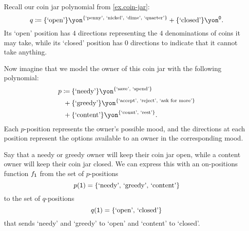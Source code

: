 \documentclass[Book-Poly]{subfiles}
\begin{document}
\begin{example}
  Recall our coin jar polynomial from \cref{ex.coin-jar}:
  \[
    q\coloneqq\{\text{`open'}\}\yon^{\{\text{`penny', `nickel', `dime', `quarter'}\}}+\{\text{`closed'}\}\yon^\0.
  \]
  Its `open' position has $4$ directions representing the $4$ denominations of coins it may take, while its `closed' position has $0$ directions to indicate that it cannot take anything.

  Now imagine that we model the owner of this coin jar with the following polynomial:
  \begin{align*}
    p\coloneqq\:
    &\{\text{`needy'}\}\yon^{\{\text{`save', `spend'}\}}
      \\
    +\:
    &\{\text{`greedy'}\}\yon^{\{\text{`accept', `reject', `ask for more'}\}}
      \\
    +\:
    &\{\text{`content'}\}\yon^{\{\text{`count', `rest'}\}}.
  \end{align*}
  Each $p$-position represents the owner's possible mood, and the directions at each position represent the options available to an owner in the corresponding mood.

  Say that a needy or greedy owner will keep their coin jar open, while a content owner will keep their coin jar closed.
  We can express this with an on-positions function $f_{\textsf{1}}$ from the set of $p$-positions
  \[
    p(\textsf{1}) = \{\text{`needy', `greedy', `content'}\}
  \]
  to the set of $q$-positions
  \[
    q(\textsf{1}) = \{\text{`open', `closed'}\}
  \]
  that sends `needy' and `greedy' to `open' and `content' to `closed'.


\end{example}
\end{document}
